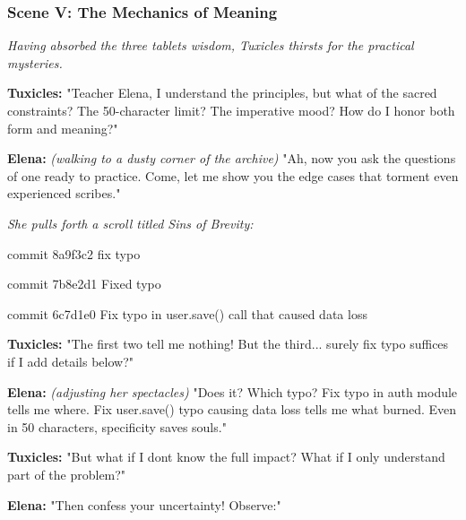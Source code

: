 \bookdivider

\subsubsection{Scene V: The Mechanics of Meaning}\label{scene-v-the-mechanics-of-meaning}

\emph{Having absorbed the three tablets\textquotesingle{} wisdom, Tuxicles thirsts for the practical mysteries.}

\textbf{Tuxicles:} "Teacher Elena, I understand the principles, but what of the sacred constraints? The 50-character limit? The imperative mood? How do I honor both form and meaning?"

\textbf{Elena:} \emph{(walking to a dusty corner of the archive)} "Ah, now you ask the questions of one ready to practice. Come, let me show you the edge cases that torment even experienced scribes."

\emph{She pulls forth a scroll titled \textquotesingle Sins of Brevity\textquotesingle:}

\begin{codeblock}
commit 8a9f3c2
fix typo

commit 7b8e2d1  
Fixed typo

commit 6c7d1e0
Fix typo in user.save() call that caused data loss
\end{codeblock}

\textbf{Tuxicles:} "The first two tell me nothing! But the third... surely \textquotesingle fix typo\textquotesingle{} suffices if I add details below?"

\textbf{Elena:} \emph{(adjusting her spectacles)} "Does it? Which typo? \textquotesingle Fix typo in auth module\textquotesingle{} tells me where. \textquotesingle Fix user.save() typo causing data loss\textquotesingle{} tells me what burned. Even in 50 characters, specificity saves souls."

\textbf{Tuxicles:} "But what if I don\textquotesingle t know the full impact? What if I only understand part of the problem?"

\textbf{Elena:} "Then confess your uncertainty! Observe:"


